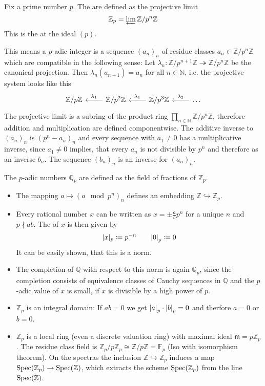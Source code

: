 \begin{definition}
	Fix a prime number $p$.
	The  are defined as the projective limit 
	\[
		\mathbb{Z}_p = \varprojlim \mathbb{Z}/p^n \mathbb{Z}
	\]
	This is the  at the ideal $(p)$.
\end{definition}
This means a $p$-adic integer is a sequence $(a_n)_n$ of residue classes $a_n \in \mathbb{Z}/p^n \mathbb{Z}$ which are compatible in the following sense:
Let $\lambda_n \colon \mathbb{Z}/p^{n+1} \mathbb{Z} \twoheadrightarrow \mathbb{Z}/p^n \mathbb{Z}$ be the canonical projection.
Then $\lambda_n(a_{n+1}) = a_n$ for all $n \in \mathbb{N}$, i.e. the projective system looks like this
\[
	\begin{tikzcd}
		\mathbb{Z}/p \mathbb{Z} & \mathbb{Z}/p^2 \mathbb{Z} \lar["\lambda_1"'] & \mathbb{Z}/p^3 \mathbb{Z} \lar["\lambda_1"'] & \ldots \lar["\lambda_3"']
	\end{tikzcd}
\]
The projective limit is a subring of the product ring $\prod_{n \in \mathbb{N}} \mathbb{Z}/p^n \mathbb{Z}$, therefore addition and multiplication are defined componentwise.
The additive inverse to $(a_n)_n$ is $(p^n - a_n)_n$ and every sequence with $a_1 \neq 0$ has a multiplicative inverse, since $a_1 \neq 0$ implies, that every $a_n$ is not divisible by $p^n$ and therefore as an inverse $b_n$.
The sequence $(b_n)_n$ is an inverse for $(a_n)_n$.

\begin{definition}
	The $p$-adic numbers $\mathbb{Q}_p$ are defined as the field of fractions of $\mathbb{Z}_p$.
\end{definition}

\begin{itemize}
	\item The mapping $a \mapsto (a \mod p^n)_n$ defines an embedding $\mathbb{Z} \hookrightarrow \mathbb{Z}_p$.
	\item Every rational number $x$ can be written as $x = \pm \frac{a}{b} p^n$ for a unique $n$ and $p \nmid ab$.
	The  of $x$ is then given by
	\[
		\abs{x}_p \coloneqq p^{-n} \qquad \abs*{0}_p \coloneqq 0
	\]
	It can be easily shown, that this is a norm.
	\item The completion of $\mathbb{Q}$ with respect to this norm is again $\mathbb{Q}_p$, since the completion consists of equivalence classes of Cauchy sequences in $\mathbb{Q}$ and the $p$-adic value of $x$ is small, if $x$ is divisible by a high power of $p$.
	\item $\mathbb{Z}_p$ is an integral domain: If $ab=0$ we get $\abs*{a}_p \cdot \abs*{b}_p = 0$ and therfore $a=0$ or $b=0$.
	\item $\mathbb{Z}_p$ is a local ring (even a discrete valuation ring) with maximal ideal $\mathfrak{m} = p \mathbb{Z}_p$.
	The residue class field is $\mathbb{Z}_p/p \mathbb{Z}_p \cong \mathbb{Z}/p \mathbb{Z} = \mathbb{F}_p$ (Iso with isomorphism theorem).
	On the spectras the inclusion $\mathbb{Z} \hookrightarrow \mathbb{Z}_p$ induces a map $\Spec(\mathbb{Z}_p) \to \Spec(\mathbb{Z})$, which extracts the scheme $\Spec(\mathbb{Z}_p)$ from the line $\Spec(\mathbb{Z})$.
\end{itemize}






\cleardoubleoddemptypage%
\setcounter{page}{1}
\appendix%
\printbibliography%
\printindex%
\todototoc%
\listoftodos[To-do's]

